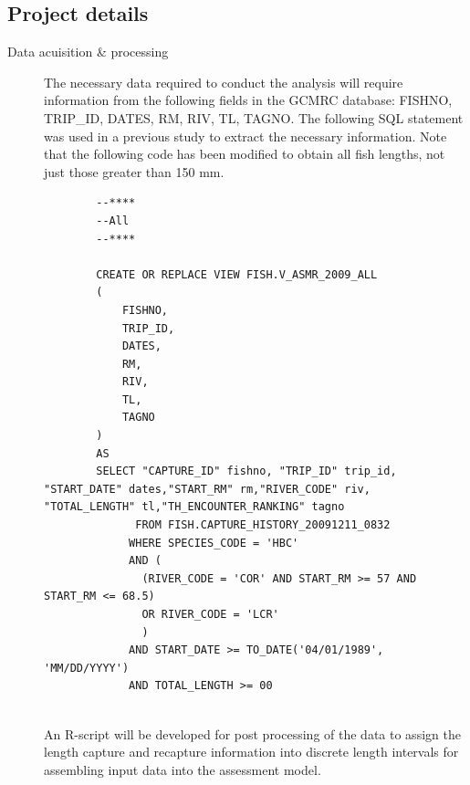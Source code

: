 \subsection*{Project details}
\begin{description}
	\item[Data acuisition \& processing] The necessary data required to conduct the analysis will require information from the following fields in the GCMRC database: FISHNO, TRIP\_ID, DATES, RM, RIV, TL, TAGNO. The following SQL statement was used in a previous study to extract the necessary information. Note that the following code has been modified to obtain all fish lengths, not just those greater than 150 mm.
	\begin{verbatim}
		--****
		--All
		--****

		CREATE OR REPLACE VIEW FISH.V_ASMR_2009_ALL
		(
		    FISHNO,
		    TRIP_ID,
		    DATES,
		    RM,
		    RIV,
		    TL,
		    TAGNO
		)
		AS
		SELECT "CAPTURE_ID" fishno, "TRIP_ID" trip_id, "START_DATE" dates,"START_RM" rm,"RIVER_CODE" riv, "TOTAL_LENGTH" tl,"TH_ENCOUNTER_RANKING" tagno
		      FROM FISH.CAPTURE_HISTORY_20091211_0832
		     WHERE SPECIES_CODE = 'HBC'
		     AND (
		       (RIVER_CODE = 'COR' AND START_RM >= 57 AND START_RM <= 68.5)
		       OR RIVER_CODE = 'LCR'
		       )
		     AND START_DATE >= TO_DATE('04/01/1989', 'MM/DD/YYYY')
		     AND TOTAL_LENGTH >= 00
		
	\end{verbatim} 
	
	An R-script will be developed for post processing of the data to assign the length capture and recapture information into discrete length intervals for assembling input data into the assessment model.
	

\end{description}
